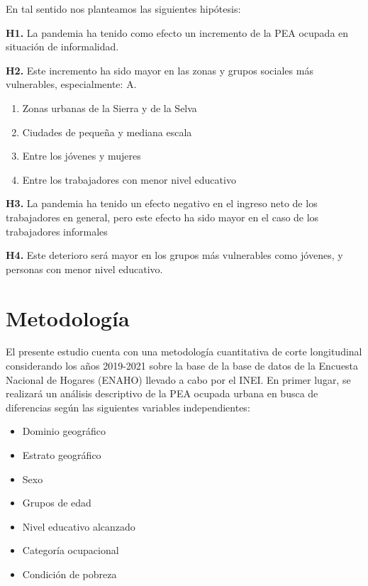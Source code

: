 \documentclass[
  letterpaper,
  12pt,
  oneside,
  spanish,
  doublespacing,
  headsepline,
  parskip]{MastersDoctoralThesis}
\begin{document}
En tal sentido nos planteamos las siguientes hipótesis:

\textbf{H1.} La pandemia ha tenido como efecto un incremento de la PEA
ocupada en situación de informalidad.

\textbf{H2.} Este incremento ha sido mayor en las zonas y grupos
sociales más vulnerables, especialmente: A.

\begin{enumerate}
\def\labelenumi{\roman{enumi}.}
\item
  Zonas urbanas de la Sierra y de la Selva
\item
  Ciudades de pequeña y mediana escala
\item
  Entre los jóvenes y mujeres
\item
  Entre los trabajadores con menor nivel educativo
\end{enumerate}

\textbf{H3.} La pandemia ha tenido un efecto negativo en el ingreso neto
de los trabajadores en general, pero este efecto ha sido mayor en el
caso de los trabajadores informales

\textbf{H4.} Este deterioro será mayor en los grupos más vulnerables
como jóvenes, y personas con menor nivel educativo.


\hypertarget{sec-metod}{%
\chapter{Metodología}\label{sec-metod}}

El presente estudio cuenta con una metodología cuantitativa de corte
longitudinal considerando los años 2019-2021 sobre la base de la base de
datos de la Encuesta Nacional de Hogares (ENAHO) llevado a cabo por el
INEI. En primer lugar, se realizará un análisis descriptivo de la PEA
ocupada urbana en busca de diferencias según las siguientes variables
independientes:

\begin{itemize}
\item
  Dominio geográfico
\item
  Estrato geográfico
\item
  Sexo
\item
  Grupos de edad
\item
  Nivel educativo alcanzado
\item
  Categoría ocupacional
\item
  Condición de pobreza
\end{itemize}
\end{document}

